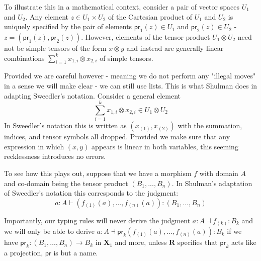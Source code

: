 \documentclass[pra,floatfix,
amsmath,superscriptaddress, 12pt]{article}
\theoremstyle{definition}
\begin{document}


To illustrate this in a mathematical context, consider a pair of vector spaces $U_1$ and $U_2$. Any element $z\in U_1 \times U_2$ of the Cartesian product of $U_1$ and $U_2$ is uniquely specified by the pair of elements $\mathsf{pr}_{1}(z) \in U_1$ and $\mathsf{pr}_{2}(z)\in U_2$ - $z=(\mathsf{pr}_1(z),\mathsf{pr}_2(z))$. However, elements of the tensor product $U_1 \otimes U_2$ need not be simple tensors of the form $x \otimes y$ and instead are generally linear combinations $\sum_{i=1}^{k}x_{1,i} \otimes x_{2,i}$ of simple tensors.

Provided we are careful however - meaning we do not perform any "illegal moves" in a sense we will make clear - we can still use lists. This is what Shulman does in adapting Sweedler's notation. Consider a general element
%
    \[
        \sum_{i=1}^{k}x_{1,i}\otimes x_{2,i} \in U_1 \otimes U_2
    \]
In Sweedler's notation this is written as $(x_{(1)}, x_{(2)})$ with the summation, indices, and tensor symbols all dropped. Provided we make sure that any expression in which $(x,y)$ appears is linear in both variables, this seeming recklessness introduces no errors.

To see how this plays out, suppose that we have a morphism $f$ with domain $A$ and co-domain being the tensor product $(B_1,...,B_n)$. In Shulman's adaptation of Sweedler's notation this corresponds to the judgment:
%
\[
a:A\vdash\left(f_{\left(1\right)}\left(a\right),\dots,f_{\left(n\right)}\left(a\right)\right):\left(B_{1},\dots,B_{n}\right)
\]
%

Importantly, our typing rules will never derive the judgment $a:A\dashv f_{(k)}:B_k$ and we will only be able to derive $a:A \dashv \mathsf{pr}_k\left(f_{\left(1\right)}\left(a\right),\dots,f_{\left(n\right)}\left(a\right)\right):B_k$ if we have $\mathsf{pr}_k:(B_1,\dots,B_n) \rightarrow B_k$ in $\mathbf{X}_1$ and more, unless $\mathbf{R}$ specifies that $\mathsf{pr}_k$ acts like a projection, $\mathsf{pr}$ is but a name.
\end{document}
